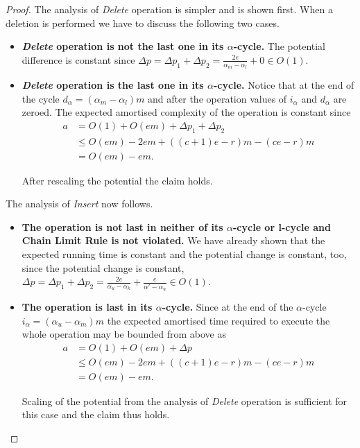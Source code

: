 \documentclass[runningheads,a4paper]{llncs}
\begin{document}
\begin{proof}
The analysis of \emph{Delete} operation is simpler and is shown first. When a deletion is performed we have to discuss the following two cases.
\begin{itemize}
\item \textbf{\emph{Delete} operation is not the last one in its $\alpha$-cycle.} The potential difference is constant since $\Delta p = \Delta p_1 + \Delta p_2 = \frac{2e}{\alpha_m - \alpha_l} + 0 \in O(1)$.

\item \textbf{\emph{Delete} operation is the last one in its $\alpha$-cycle.} Notice that at the end of the cycle $d_\alpha = (\alpha_m - \alpha_l)m$ and after the operation values of $i_\alpha$ and $d_\alpha$ are zeroed. The expected amortised complexity of the operation is constant since
\[
\begin{split}
a
	& = O(1) + O(em) + \Delta p_1 + \Delta p_2 \\
	& \leq O(em) -2em + ((c + 1)e - r)m - (ce - r)m \\
	& = O(em) - em.
\end{split}
\]

After rescaling the potential the claim holds.
\end{itemize}

The analysis of \emph{Insert} now follows.
\begin{itemize}
\item \textbf{The operation is not last in neither of its $\alpha$-cycle or l-cycle and Chain Limit Rule is not violated.}
We have already shown that the expected running time is constant and the potential change is constant, too, since the potential change is constant, 
$\Delta p = \Delta p_1 + \Delta p_2 = \frac{2e}{\alpha_u - \alpha_k} + \frac{e}{\alpha' - \alpha_u} \in O(1)$.

\item \textbf{The operation is last in its $\alpha$-cycle.} 
Since at the end of the $\alpha$-cycle $i_\alpha = (\alpha_u - \alpha_m)m$ the expected amortised time required to execute the whole operation may be bounded from above as
\[
\begin{split}
a
	& = O(1) + O(em) + \Delta p  \\
	& \leq O(em) - 2em + ((c + 1)e - r)m - (ce - r)m \\
	& = O(em) - em.
\end{split}
\]

Scaling of the potential from the analysis of \emph{Delete} operation is sufficient for this case and the claim thus holds. 


\end{itemize}
\end{proof}
\end{document}
